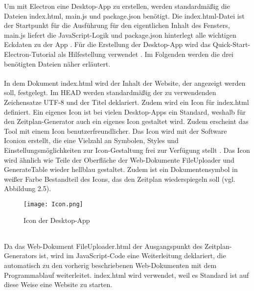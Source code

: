 Um mit Electron eine Desktop-App zu erstellen, werden standardmäßig die Dateien index.html, main.js und package.json benötigt. Die index.html-Datei ist der Startpunkt für die Ausführung für den eigentlichen Inhalt des Fensters, main.js liefert die JavaScript-Logik und package.json hinterlegt alle wichtigen Eckdaten zu der App \cite{electron}. Für die Erstellung der Desktop-App wird das Quick-Start-Electron-Tutorial als Hilfestellung verwendet \cite{electron2}. Im Folgenden werden die drei benötigten Dateien näher erläutert.\\
\\
In dem Dokument index.html wird der Inhalt der Website, der angezeigt werden soll, festgelegt.
Im HEAD werden standardmäßig der zu verwendenden Zeichensatze UTF-8 und der Titel deklariert. Zudem wird ein Icon für index.html definiert. Ein eigenes Icon ist bei vielen Desktop-Apps ein Standard, weshalb für den Zeitplan-Generator auch ein eigenes Icon gestaltet wird. Zudem erscheint das Tool mit einem Icon benutzerfreundlicher. Das Icon wird mit der Software Iconion erstellt, die eine Vielzahl an Symbolen, Styles und Einstellungsmöglichkeiten zur Icon-Gestaltung frei zur Verfügung stellt \cite{iconion}.  Das Icon wird ähnlich wie Teile der Oberfläche der Web-Dokumente FileUploader und GenerateTable wieder hellblau gestaltet. Zudem ist ein Dokumentensymbol in weißer Farbe Bestandteil des Icons, das den Zeitplan wiederspiegeln soll (vgl. Abbildung 2.5).
\begin{figure}[htbp]
  \centering
  \texttt{[image: Icon.png]}
  \caption{Icon der Desktop-App}
  \label{fig:Fig1}
\end{figure}\\
Da das Web-Dokument FileUploader.html der Ausgangspunkt des Zeitplan-Generators ist, wird im JavaScript-Code eine Weiterleitung deklariert, die automatisch zu den vorherig beschriebenen Web-Dokumenten mit dem Programmablauf weiterleitet. index.html wird verwendet, weil es Standard ist auf diese Weise eine Website zu starten. 
